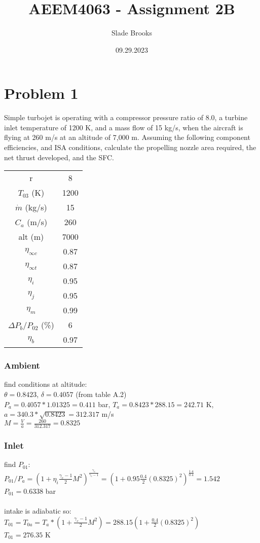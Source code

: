 \documentclass{article}
\title{AEEM4063 - Assignment 2B}
\author{Slade Brooks}
\date{09.29.2023}
\begin{document}
\maketitle

\section*{Problem 1}
Simple turbojet is operating with a compressor pressure ratio of 8.0, a turbine
inlet temperature of 1200 K, and a mass flow of 15 kg/s, when the aircraft is flying at 260
m/s at an altitude of 7,000 m. Assuming the following component efficiencies, and ISA
conditions, calculate the propelling nozzle area required, the net thrust developed, and
the SFC.
\begin{center}
\begin{tabular}{cc}
    r & 8 \\
    $T_{03}$ (K) & 1200 \\
    $\dot{m}$ (kg/s) & 15 \\
    $C_a$ (m/s) & 260 \\
    alt (m) & 7000 \\
    $\eta_{\infty c}$ & 0.87 \\
    $\eta_{\infty t}$ & 0.87 \\
    $\eta_i$ & 0.95 \\
    $\eta_j$ & 0.95 \\
    $\eta_m$ & 0.99 \\
    $\Delta P_b/P_{02}$ (\%) & 6 \\
    $\eta_b$ & 0.97
\end{tabular}
\end{center}
\subsubsection*{Ambient}
find conditions at altitude: \\
$\theta=0.8423$, $\delta=0.4057$ (from table A.2) \\
$P_a=0.4057*1.01325=0.411$ bar, $T_a=0.8423*288.15=242.71$ K, $a=340.3*\sqrt{0.8423}=312.317$ m/s \\
$M=\frac{V}{a}=\frac{260}{312.317}=0.8325$

\subsubsection*{Inlet}
find $P_{01}$: \\
$P_{01}/P_a=(1+\eta_i\frac{\gamma_c-1}{2}M^2)^\frac{\gamma_c}{\gamma_c-1}=
(1+0.95\frac{0.4}{2}(0.8325)^2)^\frac{1.4}{0.4}=1.542$ \\
$P_{01}=0.6338$ bar \\\\
intake is adiabatic so: $T_{01}=T_{0a}=T_a*(1+\frac{\gamma_c-1}{2}M^2)=
288.15(1+\frac{0.4}{2}(0.8325)^2)$ \\
$T_{01}=276.35$ K
\end{document}
